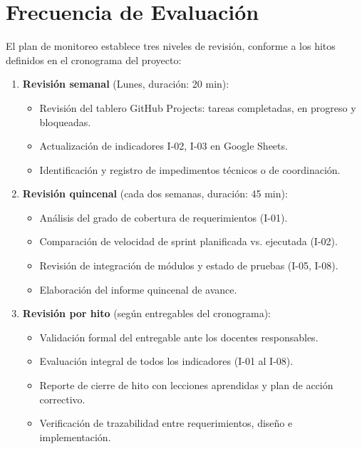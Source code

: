 \section{Frecuencia de Evaluación}
El plan de monitoreo establece tres niveles de revisión, conforme a los hitos definidos en el
cronograma del proyecto:

\begin{enumerate}[label=\textbf{\alph*.}]
    \item \textbf{Revisión semanal} (Lunes, duración: 20 min):
    \begin{itemize}
        \item Revisión del tablero GitHub Projects: tareas completadas, en progreso y bloqueadas.
        \item Actualización de indicadores I-02, I-03 en Google Sheets.
        \item Identificación y registro de impedimentos técnicos o de coordinación.
    \end{itemize}

    \item \textbf{Revisión quincenal} (cada dos semanas, duración: 45 min):
    \begin{itemize}
        \item Análisis del grado de cobertura de requerimientos (I-01).
        \item Comparación de velocidad de sprint planificada vs. ejecutada (I-02).
        \item Revisión de integración de módulos y estado de pruebas (I-05, I-08).
        \item Elaboración del informe quincenal de avance.
    \end{itemize}

    \item \textbf{Revisión por hito} (según entregables del cronograma):
    \begin{itemize}
        \item Validación formal del entregable ante los docentes responsables.
        \item Evaluación integral de todos los indicadores (I-01 al I-08).
        \item Reporte de cierre de hito con lecciones aprendidas y plan de acción correctivo.
        \item Verificación de trazabilidad entre requerimientos, diseño e implementación.
    \end{itemize}
\end{enumerate}

